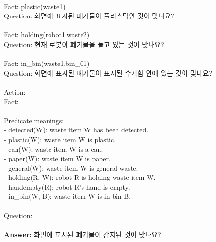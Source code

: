 \begin{tcolorbox}[breakable, title=Prompt for feedback manager (Waste Sorting), title filled=false, colback=black!5!white, colframe=black!75!black, left=2pt, right=2pt, top=2pt, bottom=2pt]
\\
Fact: plastic(waste1)\\
Question: 화면에 표시된 폐기물이 플라스틱인 것이 맞나요?\\
\\
Fact: holding(robot1,waste2)\\
Question: 현재 로봇이 폐기물을 들고 있는 것이 맞나요?\\
\\
Fact: in\_bin(waste1,bin\_01)\\
Question: 화면에 표시된 폐기물이 표시된 수거함 안에 있는 것이 맞나요?\\
\\
Action: \\
Fact: \\
\\
Predicate meanings:\\
- detected(W): waste item W has been detected.\\
- plastic(W): waste item W is plastic.\\
- can(W): waste item W is a can.\\
- paper(W): waste item W is paper.\\
- general(W): waste item W is general waste.\\
- holding(R, W): robot R is holding waste item W.\\
- handempty(R): robot R's hand is empty.\\
- in\_bin(W, B): waste item W is in bin B.\\
\\
Question:
\\
\\
\textbf{Answer: } 화면에 표시된 폐기물이 감지된 것이 맞나요?

\end{tcolorbox}



